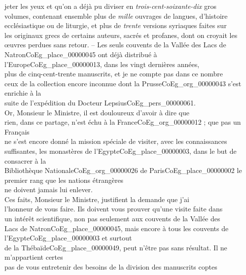 \documentclass{book}
\begin{document}
jeter les yeux et qu’on a déjà pu diviser en \textit{trois-cent-soixante-dix} gros\\
volumes, contenant ensemble plus de \textit{mille} ouvrages de langues, d’histoire\\
ecclésiastique ou de liturgie, et plus de \textit{trente} versions syriaques faites sur\\
les originaux grecs de certains auteurs, sacrés et profanes, dont on croyait les\\
œuvres perdues sans retour. – Les seuls couvents de la Vallée des Lacs de\\
Natron\gls{CoEg_place_00000045} ont déjà distribué à l’Europe\gls{CoEg_place_00000013}, dans les vingt dernières années,\\
plus de cinq-cent-trente manuscrits, et je ne compte pas dans ce nombre\\
ceux de la collection encore inconnue dont la Prusse\gls{CoEg_org_00000043} s’est enrichie à la\\
suite de l’expédition du Docteur Lepsius\gls{CoEg_pers_00000061}.\\
\indent Or, Monsieur le Ministre, il est douloureux d’avoir à dire que\\
rien, dans ce partage, n’est échu à la France\gls{CoEg_org_00000012} ; que pas un Français\\
ne s’est encore donné la mission spéciale de visiter, avec les connaissances\\
suffisantes, les monastères de l’Egypte\gls{CoEg_place_00000003}, dans le but de consacrer à la\\
Bibliothèque Nationale\gls{CoEg_org_00000026} de Paris\gls{CoEg_place_00000002} le premier rang que les nations étrangères\\
ne doivent jamais lui enlever.\\
\indent Ces faits, Monsieur le Ministre, justifient la demande que j’ai\\
l’honneur de vous faire. Ils doivent vous prouver qu’une visite faite dans\\
un intérêt scientifique, non pas seulement aux couvents de la Vallée des\\
Lacs de Natron\gls{CoEg_place_00000045}, mais encore à tous les couvents de l’Egypte\gls{CoEg_place_00000003} et surtout\\
de la Thébaïde\gls{CoEg_place_00000049}, peut n’être pas sans résultat. Il ne m’appartient certes\\
pas de vous entretenir des besoins de la division des manuscrits coptes\\
\end{document}
